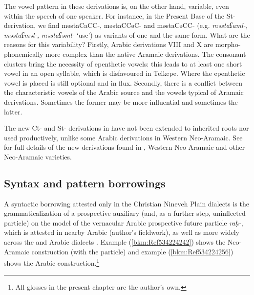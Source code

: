 \documentclass[output=paper]{langsci/langscibook}
\begin{document}
The vowel pattern in these derivations is, on the other hand, variable, even within the speech of one speaker. For instance, in the Present Base of the St-{derivation}, we find məstaCaCC-, məstaCCəC- and məstaCəCC- (e.g. \textit{məstaʕaml-,} \textit{məstaʕməl-,} \textit{məstaʕəml-} ‘use’) as variants of one and the same form. What are the reasons for this variability? Firstly, Arabic derivations VIII and X are morpho-phonemically more complex than the native Aramaic derivations. The {consonant clusters} bring the necessity of epenthetic vowels: this leads to at least one short vowel in an open syllable, which is disfavoured in Telkepe. Where the epenthetic vowel is placed is still optional and in flux. Secondly, there is a conflict between the characteristic vowels of the  Arabic source and the vowels typical of Aramaic derivations. Sometimes the former may be more influential and sometimes the latter.

The new Ct- and St- derivations in  have not been extended to inherited {roots} nor used productively, unlike some Arabic derivations in {Western} Neo-Aramaic. See \citet{Coghill2015} for full details of the new derivations found in , {Western} Neo-Aramaic and other Neo-Aramaic varieties.

\subsection{\label{bkm:Ref534214095}Syntax and pattern borrowings}

A syntactic borrowing attested only in the Christian Nineveh Plain dialects is the {grammaticalization} of a {prospective} auxiliary (and, as a further step, uninflected particle) on the model of the vernacular Arabic {prospective} {future} particle \textit{raḥ-}, which is attested in nearby  Arabic (author’s fieldwork), as well as more widely across the  and  Arabic dialects \citep[304]{Jastrow1978}. Example (\ref{bkm:Ref534224242}) shows the Neo-Aramaic construction (with the particle) and example (\ref{bkm:Ref534224256}) shows the Arabic construction.\footnote{All glosses in the present chapter are the author's own.}

\end{document}
